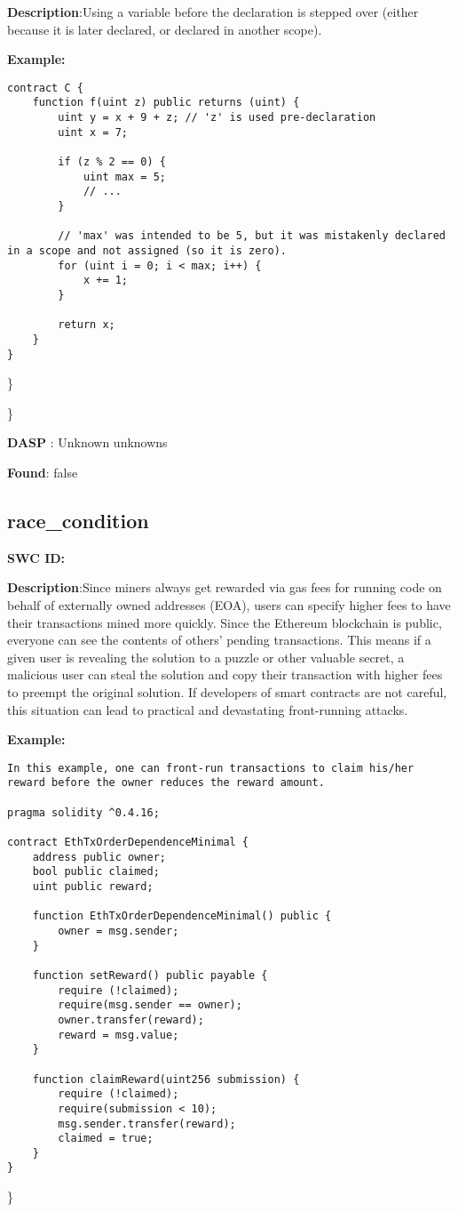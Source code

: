 \documentclass{article}
\begin{document}
\textbf{Description}:Using a variable before the declaration is stepped over (either because it is later declared, or declared in another scope).


\textbf{Example:} 
\begin{verbatim}
contract C {
    function f(uint z) public returns (uint) {
        uint y = x + 9 + z; // 'z' is used pre-declaration
        uint x = 7;

        if (z % 2 == 0) {
            uint max = 5;
            // ...
        }

        // 'max' was intended to be 5, but it was mistakenly declared in a scope and not assigned (so it is zero).
        for (uint i = 0; i < max; i++) {
            x += 1;
        }

        return x;
    }
}

\end{verbatim}\} 

\} 

\textbf{DASP} : Unknown unknowns

\textbf{Found}: false

\subsection{race\_condition} 
\textbf{SWC \textunderscore ID:} 

\textbf{Description}:Since miners always get rewarded via gas fees for running code on behalf of externally owned addresses (EOA), users can specify higher fees to have their transactions mined more quickly. Since the Ethereum blockchain is public, everyone can see the contents of others' pending transactions. This means if a given user is revealing the solution to a puzzle or other valuable secret, a malicious user can steal the solution and copy their transaction with higher fees to preempt the original solution. If developers of smart contracts are not careful, this situation can lead to practical and devastating front-running attacks.


\textbf{Example:} 
\begin{verbatim}
In this example, one can front-run transactions to claim his/her reward before the owner reduces the reward amount.

pragma solidity ^0.4.16;

contract EthTxOrderDependenceMinimal {
    address public owner;
    bool public claimed;
    uint public reward;

    function EthTxOrderDependenceMinimal() public {
        owner = msg.sender;
    }

    function setReward() public payable {
        require (!claimed);
        require(msg.sender == owner);
        owner.transfer(reward);
        reward = msg.value;
    }

    function claimReward(uint256 submission) {
        require (!claimed);
        require(submission < 10);
        msg.sender.transfer(reward);
        claimed = true;
    }
}

\end{verbatim}\} 
\end{document}
